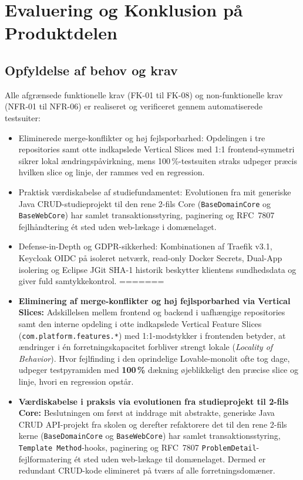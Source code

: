 \documentclass[11pt,a4paper]{article}
\begin{document}
\begin{table}[htbp]
\section{Evaluering og Konklusion på Produktdelen}

\subsection{Opfyldelse af behov og krav}
Alle afgrænsede funktionelle krav (FK-01 til FK-08) og non-funktionelle krav (NFR-01 til NFR-06) er realiseret og verificeret gennem automatiserede testsuiter:
\begin{itemize}[noitemsep]
<<<<<<< HEAD
    \item Eliminerede merge-konflikter og høj fejlsporbarhed: Opdelingen i tre repositories samt otte indkapslede Vertical Slices med 1:1 frontend-symmetri sikrer lokal ændringspåvirkning, mens 100\,\%-testsuiten straks udpeger præcis hvilken slice og linje, der rammes ved en regression.
    \item Praktisk værdiskabelse af studiefundamentet: Evolutionen fra mit generiske Java CRUD-studieprojekt til den rene 2-fils Core (\texttt{BaseDomainCore} og \texttt{BaseWebCore}) har samlet transaktionsstyring, paginering og RFC~7807 fejlhåndtering ét sted uden web-lækage i domænelaget.
    \item Defense-in-Depth og GDPR-sikkerhed: Kombinationen af Traefik v3.1, Keycloak OIDC på isoleret netværk, read-only Docker Secrets, Dual-App isolering og Eclipse JGit SHA-1 historik beskytter klientens sundhedsdata og giver fuld samtykkekontrol.
=======
    \item \textbf{Eliminering af merge-konflikter og høj fejlsporbarhed via Vertical Slices:} Adskillelsen mellem frontend og backend i uafhængige repositories samt den interne opdeling i otte indkapslede Vertical Feature Slices (\texttt{com.platform.features.*}) med 1:1-modstykker i frontenden betyder, at ændringer i én forretningskapacitet forbliver strengt lokale (\textit{Locality of Behavior}). Hvor fejlfinding i den oprindelige Lovable-monolit ofte tog dage, udpeger testpyramiden med \textbf{100\,\%} dækning øjeblikkeligt den præcise slice og linje, hvori en regression opstår.
    \item \textbf{Værdiskabelse i praksis via evolutionen fra studieprojekt til 2-fils Core:} Beslutningen om først at inddrage mit abstrakte, generiske Java CRUD API-projekt fra skolen og derefter refaktorere det til den rene 2-fils kerne (\texttt{BaseDomainCore} og \texttt{BaseWebCore}) har samlet transaktionsstyring, \texttt{Template Method}-hooks, paginering og RFC~7807 \texttt{ProblemDetail}-fejlformatering ét sted uden web-lækage til domænelaget. Dermed er redundant CRUD-kode elimineret på tværs af alle forretningsdomæner.

\end{itemize}
\end{table}
\end{document}
